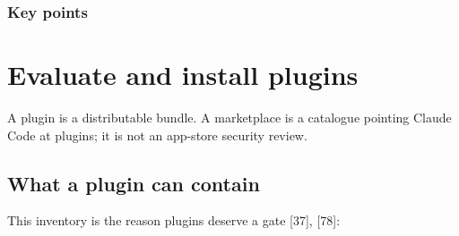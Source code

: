 \documentclass[11pt,a4paper,twoside,openany]{book}
\newcommand{\chaptertitlelabel}{}
\begin{document}
  \subsection*{Key points}
  \begin{itemize}\kprows\end{itemize}
\else
  \noindent\kpbody
\fi
\par\addvspace{1.4mm}
\endgroup


\FloatBarrier
\renewcommand{\chaptertitlelabel}{Part IV \textperiodcentered\ Chapter 18}
\setcounter{chapter}{17}
\chapter{Evaluate and install plugins}

A plugin is a distributable bundle. A marketplace is a catalogue pointing Claude Code at plugins; it is not an app-store security review.


\FloatBarrier
\setcounter{section}{0}
\section{What a plugin can contain}

This inventory is the reason plugins deserve a gate [37], [78]:
\end{document}
